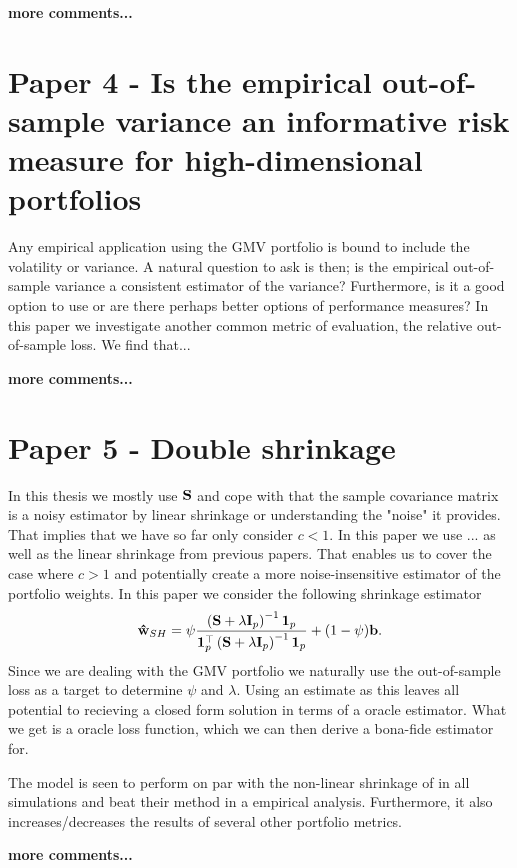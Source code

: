 \documentclass[]{book}\usepackage{knitr}
\begin{document}
\textbf{more comments...}
\section*{Paper 4 - Is the empirical out-of-sample variance an informative risk measure for high-dimensional portfolios}\label{sec:paper4}
Any empirical application using the GMV portfolio is bound to include the volatility or variance. 
A natural question to ask is then; is the empirical out-of-sample variance a consistent estimator of the variance? 
Furthermore, is it a good option to use or are there perhaps better options of performance measures? 
In this paper we investigate another common metric of evaluation, the relative out-of-sample loss.   
We find that...

\textbf{more comments...}
\section*{Paper 5 - Double shrinkage}\label{sec:paper5}
In this thesis we mostly use $\mathbf{S}$ and cope with that the sample covariance matrix is a noisy estimator by linear shrinkage or understanding the "noise" it provides.
That implies that we have so far only consider $c<1$.
In this paper we use ... as well as the linear shrinkage from previous papers. 
That enables us to cover the case where $c>1$ and potentially create a more noise-insensitive estimator of the portfolio weights.
In this paper we consider the following shrinkage estimator
$$
\mathbf{\hat{w}}_{SH} = \psi \frac{\left(\mathbf{S} + \lambda \mathbf{I}_p \right)^{-1}\mathbf{1}_p}{\mathbf{1}_p^\top\left(\mathbf{S} + \lambda \mathbf{I}_p \right)^{-1}\mathbf{1}_p} + (1-\psi)\mathbf{b}.
$$
Since we are dealing with the GMV portfolio we naturally use the out-of-sample loss as a target to determine $\psi$ and $\lambda$.
Using an estimate as this leaves all potential to recieving a closed form solution in terms of a oracle estimator.
What we get is a oracle loss function, which we can then derive a bona-fide estimator for.

The model is seen to perform on par with the non-linear shrinkage of \citet{lw20} in all simulations and beat their method in a empirical analysis.
Furthermore, it also increases/decreases the results of several other portfolio metrics.

\textbf{more comments...}
\end{document}
